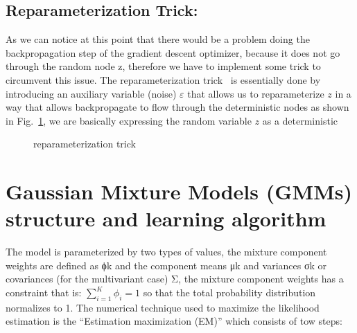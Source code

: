 \subsection{Reparameterization Trick:}
As we can notice at this point that there would be a problem doing the backpropagation step of the gradient descent optimizer, because it does not go through the random node z, therefore we have to implement some trick to circumvent this issue. The reparameterization trick~\cite{kingma2013auto} is essentially done by introducing an auxiliary variable (noise) $\varepsilon$ that allows us to reparameterize $z$ in a way that allows backpropagate to flow through the deterministic nodes as shown in Fig.~\ref{fig:paratrick}, we are basically expressing the random variable $z$ as a deterministic 

\begin{figure}
	\centerline
	\paratrick
	\caption{reparameterization trick}
	\label{fig:paratrick}
\end{figure} 

\section{Gaussian Mixture Models (GMMs) structure and learning algorithm}
The model is parameterized by two types of values, the mixture component weights are defined as ϕk and the component means μk and variances σk or covariances (for the multivariant case) Σ, the mixture component weights has a constraint that is:  $\sum_{i=1}^{K} \phi_i = 1$ so that the total probability distribution normalizes to 1. The numerical technique used to maximize the likelihood estimation is the “Estimation maximization (EM)” which consists of tow steps:

